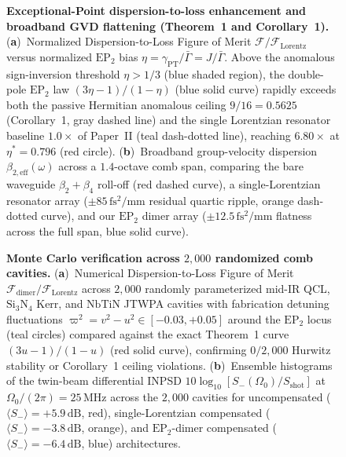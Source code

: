 \documentclass[11pt,letterpaper]{article}
\theoremstyle{definition}
\theoremstyle{remark}
\begin{document}
\begin{figure}[t!]
\centering
\resizebox{0.98\textwidth}{!}{}
\caption{\textbf{Exceptional-Point dispersion-to-loss enhancement and broadband GVD flattening (Theorem~1 and Corollary~1).} (\textbf{a})~Normalized Dispersion-to-Loss Figure of Merit $\mathcal{F}/\mathcal{F}_{\mathrm{Lorentz}}$ versus normalized $\mathrm{EP}_2$ bias $\eta = \gamma_{\mathrm{PT}}/\bar{\Gamma} = J/\bar{\Gamma}$. Above the anomalous sign-inversion threshold $\eta > 1/3$ (blue shaded region), the double-pole $\mathrm{EP}_2$ law $(3\eta - 1)/(1 - \eta)$ (blue solid curve) rapidly exceeds both the passive Hermitian anomalous ceiling $9/16 = 0.5625$ (Corollary~1, gray dashed line) and the single Lorentzian resonator baseline $1.0\times$ of Paper~II (teal dash-dotted line), reaching $6.80\times$ at $\eta^* = 0.796$ (red circle). (\textbf{b})~Broadband group-velocity dispersion $\beta_{2,\mathrm{eff}}(\omega)$ across a $1.4$-octave comb span, comparing the bare waveguide $\beta_2 + \beta_4$ roll-off (red dashed curve), a single-Lorentzian resonator array ($\pm 85\,\mathrm{fs^2/mm}$ residual quartic ripple, orange dash-dotted curve), and our $\mathrm{EP}_2$ dimer array ($\pm 12.5\,\mathrm{fs^2/mm}$ flatness across the full span, blue solid curve).}
\label{fig:thm1_dispersion}
\end{figure}

\begin{figure}[t!]
\centering
\resizebox{0.98\textwidth}{!}{}
\caption{\textbf{Monte Carlo verification across $2{,}000$ randomized comb cavities.} (\textbf{a})~Numerical Dispersion-to-Loss Figure of Merit $\mathcal{F}_{\mathrm{dimer}}/\mathcal{F}_{\mathrm{Lorentz}}$ across $2{,}000$ randomly parameterized mid-IR QCL, $\mathrm{Si_3N_4}$ Kerr, and $\mathrm{NbTiN}$ JTWPA cavities with fabrication detuning fluctuations $\varpi^2 = v^2 - u^2 \in [-0.03, +0.05]$ around the $\mathrm{EP}_2$ locus (teal circles) compared against the exact Theorem~1 curve $(3u - 1)/(1 - u)$ (red solid curve), confirming $0/2{,}000$ Hurwitz stability or Corollary~1 ceiling violations. (\textbf{b})~Ensemble histograms of the twin-beam differential INPSD $10\log_{10}[S_-(\Omega_0)/S_{\mathrm{shot}}]$ at $\Omega_0/(2\pi) = 25\,\mathrm{MHz}$ across the $2{,}000$ cavities for uncompensated ($\langle S_-\rangle = +5.9\,\mathrm{dB}$, red), single-Lorentzian compensated ($\langle S_-\rangle = -3.8\,\mathrm{dB}$, orange), and $\mathrm{EP}_2$-dimer compensated ($\langle S_-\rangle = -6.4\,\mathrm{dB}$, blue) architectures.}
\label{fig:mc_2000_combs}
\end{figure}
\end{document}
